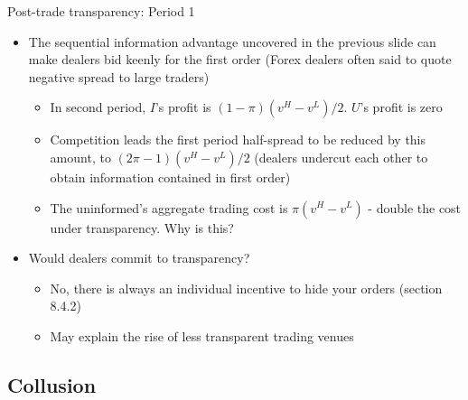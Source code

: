 \documentclass[english,10pt
,aspectratio=169
]{beamer}
\begin{document}
\begin{frame}{Post-trade transparency: Period 1}
	\begin{itemize}
		\item {} The sequential information advantage uncovered in the previous slide can make dealers bid keenly for the first order
		(Forex dealers often said to quote negative spread to large traders)
		\begin{itemize}
			\item In second period, $I$'s profit is $(1-\pi)(v^{H}-v^{L})/2$. $U$'s profit is zero
			\item Competition leads the first period half-spread to be reduced by this amount, to $(2\pi-1)(v^{H}-v^{L})/2$ (dealers undercut each other to obtain information contained in first order)
			\item The uninformed's aggregate trading cost is $\pi(v^{H}-v^{L})$ - double the cost under transparency. Why is this?
		\end{itemize}
		\item Would dealers commit to transparency?
		\begin{itemize}
			\item No, there is always an individual incentive to hide your orders (section 8.4.2)
			\item May explain the rise of less transparent trading venues
		\end{itemize}
	\end{itemize}
\end{frame}


\subsection{Collusion}
\end{document}
